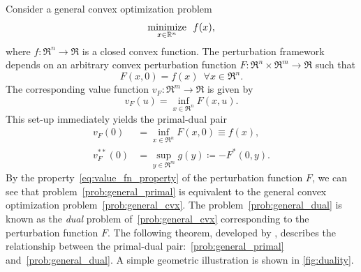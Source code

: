 Consider a general convex optimization problem
\begin{equation} \label{prob:general_cvx}
    \displaystyle\mathop{\hbox{\rm minimize}}_{x \in \mathbb{R}^n}\enspace f(x),
\end{equation}
where $f:\Re^n \to \Re$ is a closed convex function. The perturbation framework depends on an arbitrary convex perturbation function $F: \Re^n \times \Re^m \to \Re$ such that 
\begin{equation} \label{eq:value_fn_property}
    F(x, 0) = f(x) \enspace \forall x \in \Re^n.
\end{equation}
The corresponding value function $v_F : \Re^m \to \Re$ is given by 
\begin{equation}
    v_F(u) = \inf_{x \in \Re^n} F(x, u).
\end{equation}
This set-up immediately yields the primal-dual pair
\begin{align}
    v_F(0) &= \inf_{x \in \Re^n} F(x, 0) \equiv f(x), \label{prob:general_primal}\\
    v_F^{**}(0) &= \sup_{y \in \Re^m} g(y) \coloneqq -F^*(0, y). \label{prob:general_dual}
\end{align}
By the property~\eqref{eq:value_fn_property} of the perturbation function $F$, we can see that problem~\eqref{prob:general_primal} is equivalent to the general convex optimization problem~\eqref{prob:general_cvx}. The problem~\eqref{prob:general_dual} is known as the \emph{dual} problem of~\eqref{prob:general_cvx} corresponding to the perturbation function $F$. 
The following theorem, developed by \citet{rockafellar1998variational}, describes the relationship between the primal-dual pair:~\eqref{prob:general_primal} and~\eqref{prob:general_dual}. A simple geometric illustration is shown in \autoref{fig:duality}.

